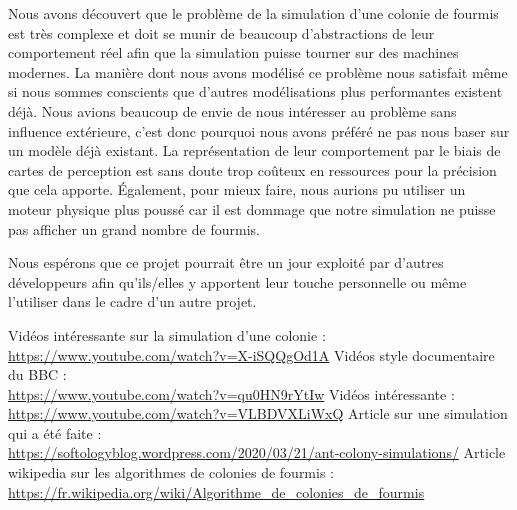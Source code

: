 \documentclass{EPUProjetDi}
\begin{document}
Nous avons découvert que le problème de la simulation d'une colonie de fourmis est très complexe et doit se munir de beaucoup d'abstractions de leur comportement réel afin que la simulation puisse tourner sur des machines modernes.
La manière dont nous avons modélisé ce problème nous satisfait même si nous sommes conscients que d'autres modélisations plus performantes existent déjà. Nous avions beaucoup de envie de nous intéresser au problème sans influence extérieure, c'est donc pourquoi nous avons préféré ne pas nous baser sur un modèle déjà existant.
La représentation de leur comportement par le biais de cartes de perception est sans doute trop coûteux en ressources pour la précision que cela apporte. Également, pour mieux faire, nous aurions pu utiliser un moteur physique plus poussé car il est dommage que notre simulation ne puisse pas afficher un grand nombre de fourmis.

Nous espérons que ce projet pourrait être un jour exploité par d'autres développeurs afin qu'ils/elles y apportent leur touche personnelle ou même l'utiliser dans le cadre d'un autre projet.


\begin{thebibliography}{99}
\label{sec:biblio}
 Vidéos intéressante sur la simulation d'une colonie : \\ \url{https://www.youtube.com/watch?v=X-iSQQgOd1A}
 Vidéos style documentaire du BBC : \\ \url{https://www.youtube.com/watch?v=qu0HN9rYtIw}
 Vidéos intéressante : \\ \url{https://www.youtube.com/watch?v=VLBDVXLiWxQ}
 Article sur une simulation qui a été faite : \\ \url{https://softologyblog.wordpress.com/2020/03/21/ant-colony-simulations/}
 Article wikipedia sur les algorithmes de colonies de fourmis : \\ \url{https://fr.wikipedia.org/wiki/Algorithme_de_colonies_de_fourmis}
\end{thebibliography}


\appendix
{}

\end{document}
